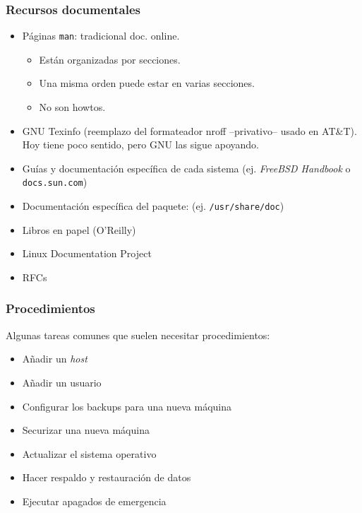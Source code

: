 \documentclass{beamer}
\begin{document}

\begin{frame}
\frametitle{Recursos documentales}

\begin{itemize}
\item Páginas \texttt{man}: tradicional doc. online.
	\begin{itemize}
	\item Están organizadas por secciones. 
	\item Una misma orden puede estar en varias secciones.
	\item No son howtos. 
	\end{itemize}
\item GNU Texinfo (reemplazo del formateador nroff --privativo-- usado en AT\&T). Hoy tiene poco sentido, pero GNU las sigue apoyando. 
\item Guías y documentación específica de cada sistema (ej. \textit{FreeBSD Handbook} o \texttt{docs.sun.com})
\item Documentación específica del paquete: (ej. \texttt{/usr/share/doc})
\item Libros en papel (O'Reilly)
\item Linux Documentation Project
\item RFCs
\end{itemize}

\end{frame}



\begin{frame}
\frametitle{Procedimientos}

Algunas tareas comunes que suelen necesitar procedimientos:

\begin{itemize}
\item Añadir un \textit{host}
\item Añadir un usuario
\item Configurar los backups para una nueva máquina
\item Securizar una nueva máquina
\item Actualizar el sistema operativo
\item Hacer respaldo y restauración de datos
\item Ejecutar apagados de emergencia
\end{itemize}
\end{frame}
\end{document}
